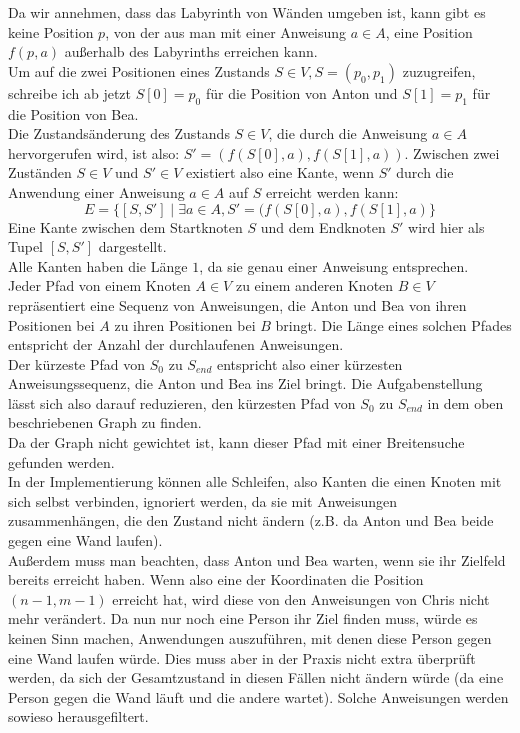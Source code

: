 \documentclass[a4paper,10pt,ngerman]{scrartcl}
\begin{document}
Da wir annehmen, dass das Labyrinth von Wänden umgeben ist, kann gibt es keine Position $p$, von der aus man mit einer Anweisung $a \in A$, eine Position $f(p,a)$ außerhalb des Labyrinths erreichen kann. \\
Um auf die zwei Positionen eines Zustands $S \in V, S = (p_0, p_1)$ zuzugreifen, schreibe ich ab jetzt $S[0] = p_0$ für die Position von Anton und $S[1] = p_1$ für die Position von Bea.\\
Die Zustandsänderung des Zustands $S \in V$, die durch die Anweisung $a \in A$ hervorgerufen wird, ist also: $S' = (f(S[0], a), f(S[1], a))$. Zwischen zwei Zuständen $S \in V$ und $S' \in V$ existiert also eine Kante, wenn $S'$ durch die Anwendung einer Anweisung $a \in A$ auf $S$ erreicht werden kann:
\[E = \{[S, S'] \mid \exists a \in A, S' = (f(S[0], a), f(S[1], a)\}\]
Eine Kante zwischen dem Startknoten $S$ und dem Endknoten $S'$ wird hier als Tupel $[S, S']$ dargestellt.\\
Alle Kanten haben die Länge $1$, da sie genau einer Anweisung entsprechen. \\
Jeder Pfad von einem Knoten $A \in V$ zu einem anderen Knoten $B \in V$ repräsentiert eine Sequenz von Anweisungen, die Anton und Bea von ihren Positionen bei $A$ zu ihren Positionen bei $B$ bringt.
Die Länge eines solchen Pfades entspricht der Anzahl der durchlaufenen Anweisungen.\\
Der kürzeste Pfad von $S_0$ zu $S_{end}$ entspricht also einer kürzesten Anweisungssequenz, die Anton und Bea ins Ziel bringt. Die Aufgabenstellung lässt sich also darauf reduzieren, den kürzesten Pfad von $S_0$ zu $S_{end}$ in dem oben beschriebenen Graph zu finden. \\
Da der Graph nicht gewichtet ist, kann dieser Pfad mit einer Breitensuche gefunden werden.\\
In der Implementierung können alle Schleifen, also Kanten die einen Knoten mit sich selbst verbinden, ignoriert werden, da sie mit Anweisungen zusammenhängen, die den Zustand nicht ändern (z.B. da Anton und Bea beide gegen eine Wand laufen). \\
Außerdem muss man beachten, dass Anton und Bea warten, wenn sie ihr Zielfeld bereits erreicht haben. Wenn also eine der Koordinaten die Position $(n-1,m-1)$ erreicht hat, wird diese von den Anweisungen von Chris nicht mehr verändert. Da nun nur noch eine Person ihr Ziel finden muss, würde es keinen Sinn machen, Anwendungen auszuführen, mit denen diese Person gegen eine Wand laufen würde. Dies muss aber in der Praxis nicht extra überprüft werden, da sich der Gesamtzustand in diesen Fällen nicht ändern würde (da eine Person gegen die Wand läuft und die andere wartet). Solche Anweisungen werden sowieso herausgefiltert.
\end{document}
